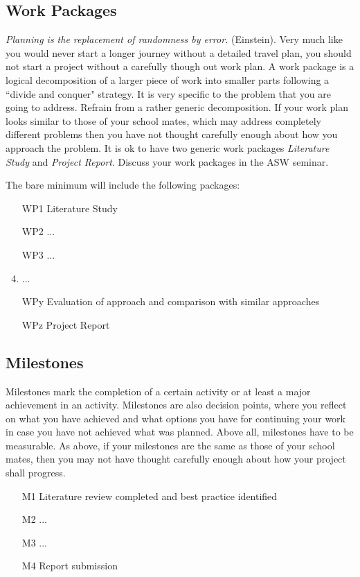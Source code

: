 \documentclass[rnd]{mas_proposal}
\begin{document}
\subsection{Work Packages}
\emph{Planning is the replacement of randomness by error.} (Einstein). Very much like you would never start a longer journey without a detailed travel plan, you should not start a project without a carefully though out work plan. A work package is a logical decomposition of a larger piece of work into smaller parts following a ``divide and conquer" strategy. It is very specific to the problem that you are going to address. Refrain from a rather generic decomposition. If your work plan looks similar to those of your school mates, which may address completely different problems then you have not thought carefully enough about how you approach the problem. It is ok to have two generic work packages \emph{Literature Study} and \emph{Project Report}. Discuss your work packages in the ASW seminar.

The bare minimum will include the following packages:
\begin{enumerate}
    \item[WP1] Literature Study
    \item[WP2] ...
    \item[WP3] ...
    \item  ...
    \item[WPy] Evaluation of approach and comparison with similar approaches
    \item[WPz] Project Report
\end{enumerate}

\subsection{Milestones}
Milestones mark the completion of a certain activity or at least a major achievement in an activity. Milestones are also decision points, where you reflect on what you have achieved and what options you have for continuing your work in case you have not achieved what was planned. Above all, milestones have to be measurable. As above, if your milestones are the same as those of your school mates, then you may not have thought carefully enough about how your project shall progress.
\begin{enumerate}
    \item[M1] Literature review completed and best practice identified
    \item[M2] ...
    \item[M3] ...
    \item[M4] Report submission
\end{enumerate}
\end{document}
